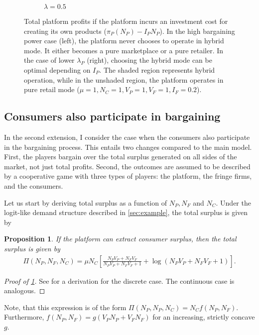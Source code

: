 \documentclass[a4paper]{article}
\newtheorem{proposition}{Proposition}
\begin{document}
\begin{figure}
\begin{subfigure}[b]{0.45\textwidth}
        \caption{$\lambda = 0.5$}
    \end{subfigure}
    \caption{Total platform profits if the platform incurs an investment cost for creating its own products ($\pi_P(N_P) - I_P N_P$). In the high bargaining power case (left), the platform never chooses to operate in hybrid mode. It either becomes a pure marketplace or a pure retailer. In the case of lower $\lambda_P$ (right), choosing the hybrid mode can be optimal depending on $I_P$. The shaded region represents hybrid operation, while in the unshaded region, the platform operates in pure retail mode ($\mu = 1, N_C = 1, V_P = 1, V_F = 1, I_F = 0.2$).}
    \label{fig:equilibrium_low_lambda_entry_fees}
\end{figure}


\subsection{Consumers also participate in bargaining}
\label{sec:two_sided}

In the second extension, I consider the case when the consumers also participate in the bargaining process.
This entails two changes compared to the main model.
First, the players bargain over the total surplus generated on all sides of the market, not just total profits.
Second, the outcomes are assumed to be described by a cooperative game with three types of players: the platform, the fringe firms, and the consumers.

Let us start by deriving total surplus as a function of $N_P, N_F$ and $N_C$.
Under the logit-like demand structure described in \cref{sec:example}, the total surplus is given by
\begin{proposition}
    \label{prop:profits_total_surplus}
    If the platform can extract consumer surplus, then the total surplus is given by
    \begin{align*}
        \Pi(N_P, N_F, N_C) = \mu N_C \left[ \frac{N_P V_P + N_F V_F}{N_P V_P + N_F V_F + 1} + \log(N_P V_P + N_F V_F + 1) \right].
    \end{align*}
\end{proposition}
\begin{proof}[Proof of \cref{prop:profits_total_surplus}]
    See \textcite{small1981applied} for a derivation for the discrete case.
    The continuous case is analogous.
\end{proof}
Note, that this expression is of the form $\Pi(N_P, N_P, N_C) = N_C f(N_P, N_F)$.
Furthermore, $f(N_P, N_F) = g(V_P N_P + V_F N_F)$ for an increasing, strictly concave $g$.
\end{document}
